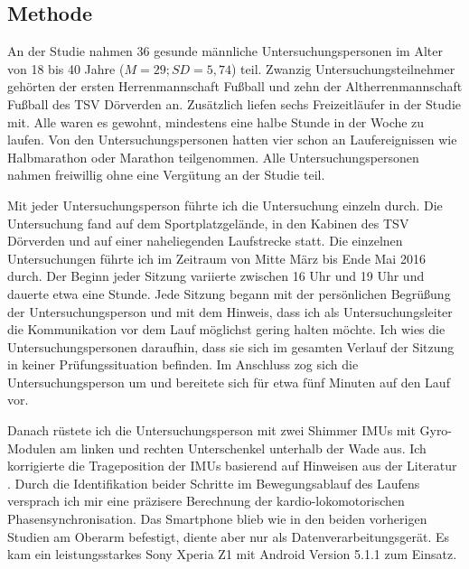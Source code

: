 \subsection{Methode} 

\label{sub:methode_5_3}

An der Studie nahmen 36 gesunde männliche Untersuchungspersonen im Alter von 18 bis 40 Jahre ($M = 29; SD = 5{,}74$) teil. Zwanzig Untersuchungsteilnehmer gehörten der ersten Herrenmannschaft Fußball und zehn der Altherrenmannschaft Fußball des TSV Dörverden an. Zusätzlich liefen sechs Freizeitläufer in der Studie mit. Alle waren es gewohnt, mindestens eine halbe Stunde in der Woche zu laufen. Von den Untersuchungspersonen hatten vier schon an Laufereignissen wie Halbmarathon oder Marathon teilgenommen. Alle Untersuchungspersonen nahmen freiwillig ohne eine Vergütung an der Studie teil. 

Mit jeder Untersuchungsperson führte ich die Untersuchung einzeln durch. Die Untersuchung fand auf dem Sportplatzgelände, in den Kabinen des TSV Dörverden und auf einer naheliegenden Laufstrecke statt. Die einzelnen Untersuchungen führte ich im Zeitraum von Mitte März bis Ende Mai 2016 durch. Der Beginn jeder Sitzung variierte zwischen 16 Uhr und 19 Uhr und dauerte etwa eine Stunde. Jede Sitzung begann mit der persönlichen Begrüßung der Untersuchungsperson und mit dem Hinweis, dass ich als Untersuchungsleiter die Kommunikation vor dem Lauf möglichst gering halten möchte. Ich wies die Untersuchungspersonen daraufhin, dass sie sich im gesamten Verlauf der Sitzung in keiner Prüfungssituation befinden. Im Anschluss zog sich die Untersuchungsperson um und bereitete sich für etwa fünf Minuten auf den Lauf vor. 

Danach rüstete ich die Untersuchungsperson mit zwei Shimmer \acp{IMU} mit Gyro-Modulen am linken und rechten Unterschenkel unterhalb der Wade aus. Ich korrigierte die Trageposition der \acp{IMU} basierend auf Hinweisen aus der Literatur \citep{Hreljac1993}. Durch die Identifikation beider Schritte im Bewegungsablauf des Laufens versprach ich mir eine präzisere Berechnung der kardio-lokomotorischen Phasensynchronisation. Das Smartphone blieb wie in den beiden vorherigen Studien am Oberarm befestigt, diente aber nur als Datenverarbeitungsgerät. Es kam ein leistungsstarkes Sony Xperia Z1 mit Android Version 5.1.1 zum Einsatz.

